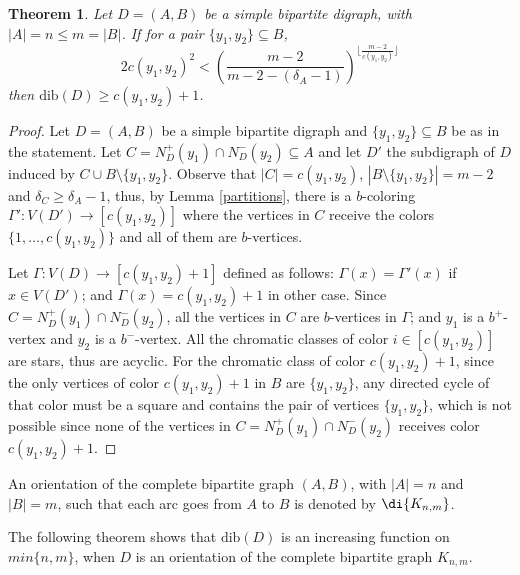 \documentclass[12pt]{article}
\newtheorem{theorem}{Theorem}
\begin{document}
\begin{theorem}
 Let $D =(A, B)$ be a simple bipartite  digraph, with $|A| = n\leq m = |B|$. If for a pair $\{y_1, y_2\}\subseteq B$, $$2 c(y_1, y_2)^2 < (\frac{m-2}{m-2-(\delta_A-1)})^{\lfloor\frac{m-2}{c(y_1, y_2)}\rfloor} $$
then  $\text{dib}(D)\geq c(y_1, y_2)+1$.
\end{theorem}
\begin{proof} Let $D =(A, B)$ be a simple bipartite  digraph and $\{y_1, y_2\}\subseteq B$ be as in the statement. Let $C= N_D^+(y_1)\cap N_D^-(y_2)\subseteq A$ and let $D'$ the subdigraph of $D$ induced by $C\cup B\setminus \{y_1, y_2\}$. Observe that $|C|=c(y_1, y_2) $, $|B\setminus \{y_1, y_2\}|=m-2$ and $\delta_C\geq \delta_A-1$, thus, by Lemma \ref{partitions},  there is a $b$-coloring $\Gamma': V(D')\rightarrow [c(y_1, y_2)]$ where the  vertices in $C$ receive the colors $\{1, \dots, c(y_1, y_2)\}$ and all of them are $b$-vertices.

Let $\Gamma:V(D)\rightarrow [c(y_1, y_2)+1]$ defined as follows: $\Gamma(x) = \Gamma'(x)$ if $x\in V(D')$; and $\Gamma(x) = c(y_1, y_2)+1$ in other case. Since $C=N_D^+(y_1)\cap N_D^-(y_2)$, all the vertices in $C$ are $b$-vertices in $\Gamma$; and $y_1$ is a $b^+$-vertex and $y_2$ is a $b^-$-vertex. All the chromatic classes of color $i\in [c(y_1, y_2)]$ are stars, thus are acyclic. For the chromatic class of color $c(y_1, y_2)+1$, since the only vertices of color $c(y_1, y_2)+1$ in $B$ are $\{y_1, y_2\}$,  any directed cycle of that color  must be a square and contains the pair of vertices $\{y_1, y_2\}$, which is not possible since none of the vertices in $C= N_D^+(y_1)\cap N_D^-(y_2)$ receives color $c(y_1, y_2)+1$. \end{proof}



An orientation of the complete bipartite graph $(A,B)$, with $|A| = n$ and $|B|=m$, such that each arc goes from $A$ to $B$ is denoted by $\di{K_{n,m}}$. 

The following theorem shows that $\text{dib}(D)$ is an increasing function on $min\{n,m\}$, when $D$ is an orientation of the complete bipartite graph $K_{n,m}$.
\end{document}
